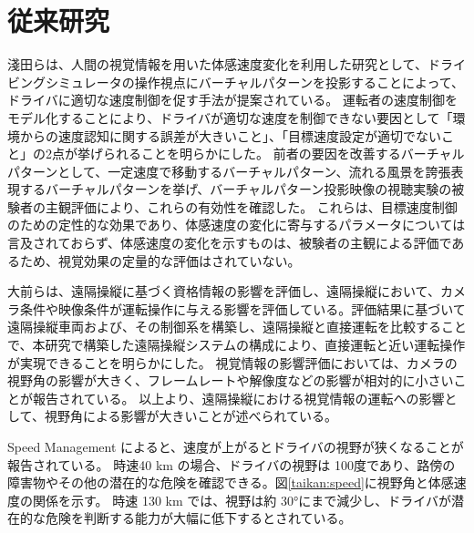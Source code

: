 \section{従来研究}
淺田ら\cite{taikan:asada}は、人間の視覚情報を用いた体感速度変化を利用した研究として、ドライビングシミュレータの操作視点にバーチャルパターンを投影することによって、ドライバに適切な速度制御を促す手法が提案されている。
運転者の速度制御をモデル化することにより、ドライバが適切な速度を制御できない要因として「環境からの速度認知に関する誤差が大きいこと」、「目標速度設定が適切でないこと」の2点が挙げられることを明らかにした。
前者の要因を改善するバーチャルパターンとして、一定速度で移動するバーチャルパターン、流れる風景を誇張表現するバーチャルパターンを挙げ、バーチャルパターン投影映像の視聴実験の被験者の主観評価により、これらの有効性を確認した。
これらは、目標速度制御のための定性的な効果であり、体感速度の変化に寄与するパラメータについては言及されておらず、体感速度の変化を示すものは、被験者の主観による評価であるため、視覚効果の定量的な評価はされていない。

大前ら\cite{taikan:ohmae}は、遠隔操縦に基づく資格情報の影響を評価し、遠隔操縦において、カメラ条件や映像条件が運転操作に与える影響を評価している。評価結果に基づいて遠隔操縦車両および、その制御系を構築し、遠隔操縦と直接運転を比較することで、本研究で構築した遠隔操縦システムの構成により、直接運転と近い運転操作が実現できることを明らかにした。
視覚情報の影響評価においては、カメラの視野角の影響が大きく、フレームレートや解像度などの影響が相対的に小さいことが報告されている。
以上より、遠隔操縦における視覚情報の運転への影響として、視野角による影響が大きいことが述べられている。

Speed Management \cite{taikan:speedmanagement}によると、速度が上がるとドライバの視野が狭くなることが報告されている。
時速40 km の場合、ドライバの視野は 100度であり、路傍の障害物やその他の潜在的な危険を確認できる。図\ref{taikan:speed}に視野角と体感速度の関係を示す。
時速 130 km では、視野は約 30°にまで減少し、ドライバが潜在的な危険を判断する能力が大幅に低下するとされている。

